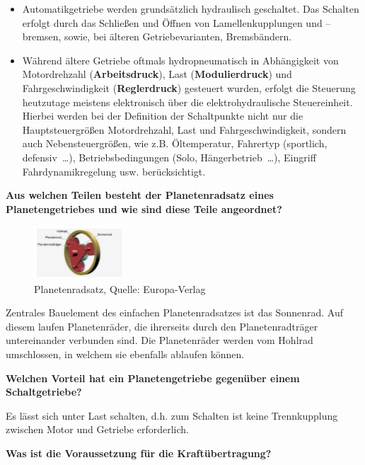 \begin{itemize}
\item
  Automatikgetriebe werden grundsätzlich hydraulisch geschaltet. Das
  Schalten erfolgt durch das Schließen und Öffnen von Lamellenkupplungen
  und --bremsen, sowie, bei älteren Getriebevarianten, Bremsbändern.
\item
  Während ältere Getriebe oftmals hydropneumatisch in Abhängigkeit von
  Motordrehzahl (\textbf{Arbeitsdruck}), Last (\textbf{Modulierdruck})
  und Fahrgeschwindigkeit (\textbf{Reglerdruck}) gesteuert wurden,
  erfolgt die Steuerung heutzutage meistens elektronisch über die
  elektrohydraulische Steuereinheit. Hierbei werden bei der Definition
  der Schaltpunkte nicht nur die Hauptsteuergrößen Motordrehzahl, Last
  und Fahrgeschwindigkeit, sondern auch Nebensteuergrößen, wie z.B.
  Öltemperatur, Fahrertyp (sportlich, defensiv~\ldots),
  Betriebsbedingungen (Solo, Hängerbetrieb~\ldots), Eingriff
  Fahrdynamikregelung usw. berücksichtigt.
\end{itemize}

\newpage

\textbf{Aus welchen Teilen besteht der Planetenradsatz eines
Planetengetriebes und wie sind diese Teile angeordnet?}

\begin{figure}[!ht]%
\centering
\includegraphics[width=0.3\textwidth]{images/Automatikgetriebe/Automatikgetriebe-6.pdf}
\caption{Planetenradsatz, Quelle: Europa-Verlag}
\end{figure}

Zentrales Bauelement des einfachen Planetenradsatzes ist das Sonnenrad.
Auf diesem laufen Planetenräder, die ihrerseits durch den
Planetenradträger untereinander verbunden sind. Die Planetenräder werden
vom Hohlrad umschlossen, in welchem sie ebenfalls ablaufen können.

\textbf{Welchen Vorteil hat ein Planetengetriebe gegenüber einem
Schaltgetriebe?}

Es lässt sich unter Last schalten, d.h. zum Schalten ist keine
Trennkupplung zwischen Motor und Getriebe erforderlich.

\textbf{Was ist die Voraussetzung für die Kraftübertragung?}

